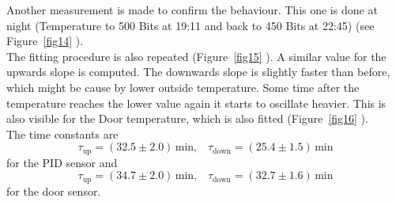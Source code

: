 \documentclass[12pt]{scrartcl}
\begin{document}
      Another measurement is made to confirm the behaviour. This one is done at
      night (Temperature to 500 Bits at 19:11 and back to 450 Bits at 22:45)
      (see Figure~\ref{fig14} ). \\ The fitting procedure is also repeated
      (Figure~\ref{fig15} ). A similar value for the upwards slope is computed. The
      downwards slope is slightly faster than before, which might be cause by
      lower outside temperature. Some time after the
      temperature reaches the lower value again it starts to oscillate heavier.
      This is also visible for the Door temperature, which is also fitted
      (Figure~\ref{fig16} ). \\
      The time constants are
      $$\tau_{\text{up}} = (32.5 \pm 2.0)\,\text{min}, \;\;\; \tau_{\text{down}} =
      (25.4 \pm 1.5) \,\text{min}$$
      for the PID sensor and
      $$\tau_{\text{up}} = (34.7 \pm 2.0) \,\text{min}, \;\;\;
      \tau_{\text{down}} = (32.7 \pm 1.6) \,\text{min}$$
      for the door sensor.
\end{document}

